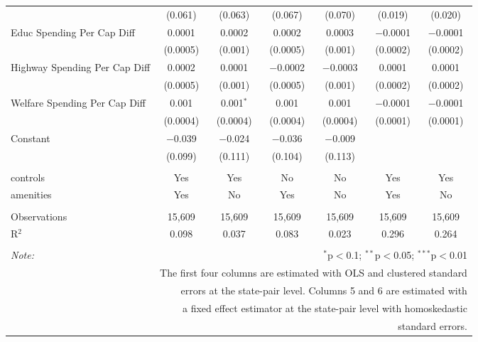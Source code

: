 \begin{table}[!htbp]
\begin{tabular}{@{\extracolsep{5pt}}lcccccc}
  & (0.061) & (0.063) & (0.067) & (0.070) & (0.019) & (0.020) \\ 
  Educ Spending Per Cap Diff & 0.0001 & 0.0002 & 0.0002 & 0.0003 & $-$0.0001 & $-$0.0001 \\ 
  & (0.0005) & (0.001) & (0.0005) & (0.001) & (0.0002) & (0.0002) \\ 
  Highway Spending Per Cap Diff & 0.0002 & 0.0001 & $-$0.0002 & $-$0.0003 & 0.0001 & 0.0001 \\ 
  & (0.0005) & (0.001) & (0.0005) & (0.001) & (0.0002) & (0.0002) \\ 
  Welfare Spending Per Cap Diff & 0.001 & 0.001$^{*}$ & 0.001 & 0.001 & $-$0.0001 & $-$0.0001 \\ 
  & (0.0004) & (0.0004) & (0.0004) & (0.0004) & (0.0001) & (0.0001) \\ 
  Constant & $-$0.039 & $-$0.024 & $-$0.036 & $-$0.009 &  &  \\ 
  & (0.099) & (0.111) & (0.104) & (0.113) &  &  \\ 
 \hline \\[-1.8ex] 
controls & Yes & Yes & No & No & Yes & Yes \\ 
amenities & Yes & No & Yes & No & Yes & No \\ 
\hline \\[-1.8ex] 
Observations & 15,609 & 15,609 & 15,609 & 15,609 & 15,609 & 15,609 \\ 
R$^{2}$ & 0.098 & 0.037 & 0.083 & 0.023 & 0.296 & 0.264 \\ 
\hline 
\hline \\[-1.8ex] 
\textit{Note:}  & \multicolumn{6}{r}{$^{*}$p$<$0.1; $^{**}$p$<$0.05; $^{***}$p$<$0.01} \\ 
 & \multicolumn{6}{r}{The first four columns are estimated with OLS and clustered standard} \\ 
 & \multicolumn{6}{r}{ errors at the state-pair level. Columns 5 and 6 are estimated with} \\ 
 & \multicolumn{6}{r}{a fixed effect estimator at the state-pair level with homoskedastic} \\ 
 & \multicolumn{6}{r}{standard errors.} \\ 
\end{tabular} 
\end{table} 
